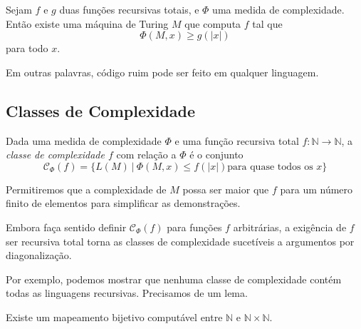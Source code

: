 \begin{theorem}
    Sejam $f$ e $g$ duas funções recursivas totais,
    e $\Phi$ uma medida de complexidade.
    Então existe uma máquina de Turing $M$ que computa $f$
    tal que
    \begin{equation*}
        \Phi(M, x) \geq g(|x|)
    \end{equation*}
    para todo $x$.
\end{theorem}

Em outras palavras,
código ruim pode ser feito em qualquer linguagem.

\subsection{Classes de Complexidade}

\begin{definition}
    Dada uma medida de complexidade $\Phi$
    e uma função recursiva total
    $f: \mathbb N \rightarrow \mathbb N$,
    a \emph{classe de complexidade $f$} com relação a $\Phi$
    é o conjunto
    \begin{equation*}
        \mathcal C_\Phi(f) = \{ L(M) \ | \ \Phi(M, x) \leq f(|x|)
            \text{para quase todos os $x$}
        \}
    \end{equation*}
\end{definition}
Permitiremos que a complexidade de $M$
possa ser maior que $f$ para um número finito de elementos
para simplificar as demonstrações.

Embora faça sentido definir $\mathcal C_\Phi(f)$
para funções $f$ arbitrárias,
a exigência de $f$ ser recursiva total
torna as classes de complexidade
sucetíveis a argumentos por diagonalização.

Por exemplo,
podemos mostrar que
nenhuma classe de complexidade contém todas as linguagens recursivas.
Precisamos de um lema.

\begin{lemma}
    Existe um mapeamento bijetivo computável
    entre $\mathbb N$ e $\mathbb N \times \mathbb N$.
\end{lemma}

